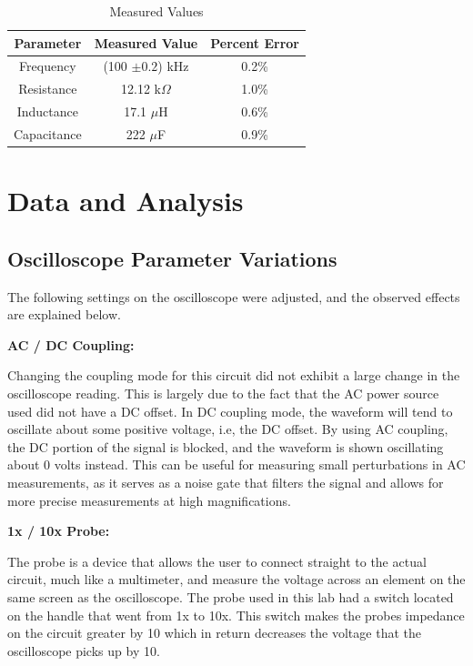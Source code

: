\documentclass[twocolumn,english]{IEEEtran}
\theoremstyle{plain}
\theoremstyle{plain}
\begin{document}
\begin{table}[h!]
\centering{}
\caption{Measured Values}
\label{tb:parameter_error}
\begin{tabular}{|c|c|c|}
\hline
\textbf{Parameter}	&\textbf{Measured Value}	&\textbf{Percent Error}	\\ \hline
Frequency		& (100 $\pm 0.2$) kHz		&0.2\%		\\ \hline
{Resistance}		& 12.12 k$\Omega$  		&1.0\% 		\\ \hline
{Inductance}		& 17.1 $\mu$H   		&0.6\% 		\\ \hline
{Capacitance}		& 222 $\mu$F  			&0.9\%		\\ \hline
\end{tabular}
\end{table}

\section{Data and Analysis}
\subsection{Oscilloscope Parameter Variations}
The following settings on the oscilloscope were adjusted, and the observed effects are explained below.

\noindent\textbf{AC / DC Coupling: }

Changing the coupling mode for this circuit did not exhibit a large change in the oscilloscope reading. This is largely due to the fact that the AC power source used did not have a DC offset. In DC coupling mode, the waveform will tend to oscillate about some positive voltage, i.e, the DC offset. By using AC coupling, the DC portion of the signal is blocked, and the waveform is shown oscillating about 0 volts instead. This can be useful for measuring small perturbations in AC measurements, as it serves as a noise gate that filters the signal and allows for more precise measurements at high magnifications.

\noindent\textbf{1x / 10x Probe: }

The probe is a device that allows the user to connect straight to the actual circuit, much like a multimeter, and measure the voltage across an element on the same screen as the oscilloscope. The probe used in this lab had a switch located on the handle that went from 1x to 10x. This switch makes the probes impedance on the circuit greater by 10 which in return decreases the voltage that the oscilloscope picks up by 10.
\end{document}
